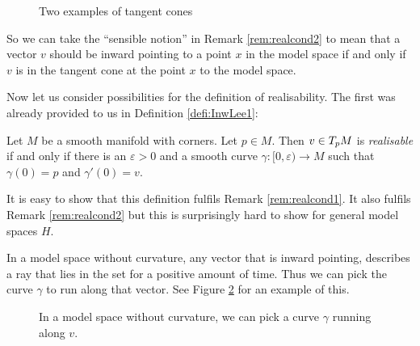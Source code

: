 \begin{figure}
\centering
{}
\caption{Two examples of tangent cones}
\label{fig:tancone}
\end{figure}

So we can take the ``sensible notion'' in Remark \ref{rem:realcond2} to mean that a vector $v$ should be inward pointing to a point $x$ in the model space if and only if $v$ is in the tangent cone at the point $x$ to the model space. 

Now let us consider possibilities for the definition of realisability.
The first was already provided to us in Definition \ref{defi:InwLee1}: 

\begin{defi}
    Let $M$ be a smooth manifold with corners. Let $p \in M$. Then $v \in T_{p}M$ is \emph{realisable} if and only if there is an $\varepsilon > 0$ and a smooth curve $\gamma \colon [0, \varepsilon) \to M$ such that $\gamma (0) = p$ and $\gamma' (0) = v$.
\end{defi}

It is easy to show that this definition fulfils Remark \ref{rem:realcond1}. 
It also fulfils Remark \ref{rem:realcond2} but this is surprisingly hard to show for general model spaces $H$. 

In a model space without curvature, any vector that is inward pointing, describes a ray that lies in the set for a positive amount of time. 
Thus we can pick the curve $\gamma$ to run along that vector. 
See Figure \ref{fig:curveWithoutCurvature} for an example of this. 

\begin{figure}
\centering
{}
\caption{In a model space without curvature, we can pick a curve $\gamma$ running along $v$.}
\label{fig:curveWithoutCurvature}
\end{figure}

